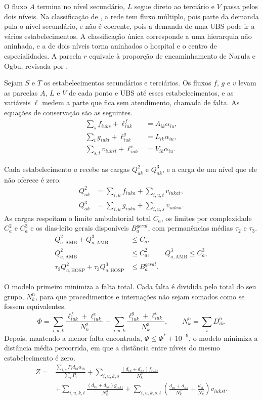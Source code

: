 \documentclass[12pt,a4paper,oneside]{report}
\begin{document}
O fluxo $A$ termina no nível secundário, $L$ segue direto ao terciário e $V$ passa pelos dois níveis. Na
classificação de \citet{sahin2007}, a rede tem fluxo múltiplo, pois parte da demanda pula o nível
secundário, e não é coerente, pois a demanda de uma UBS pode ir a vários estabelecimentos. A classificação
única corresponde a uma hierarquia não aninhada, e a de dois níveis torna aninhados o hospital e o centro
de especialidades. A parcela $r$ equivale à proporção de encaminhamento de Narula e Ogbu, revisada por
\citet{narula1986}.

Sejam $S$ e $T$ os estabelecimentos secundários e terciários. Os fluxos $f$, $g$ e $v$ levam as parcelas
$A$, $L$ e $V$ de cada ponto e UBS até esses estabelecimentos, e as variáveis $\ell$ medem a parte que
fica sem atendimento, chamada de falta. As equações de conservação são as seguintes.
\begin{align}
\sum_s f_{iuks}+\ell^f_{iuk}&=A_{ik}\alpha_{iu},\\
\sum_t g_{iukt}+\ell^g_{iuk}&=L_{ik}\alpha_{iu},\\
\sum_{s,t}v_{iukst}+\ell^v_{iuk}&=V_{ik}\alpha_{iu}.
\end{align}

Cada estabelecimento $a$ recebe as cargas $Q^2_{ak}$ e $Q^3_{ak}$, e a carga de um nível que ele não
oferece é zero.
\begin{align}
Q^2_{ak}&=\sum_{i,u}f_{iuka}+\sum_{i,u,t}v_{iukat},\\
Q^3_{ak}&=\sum_{i,u}g_{iuka}+\sum_{i,u,s}v_{iuksa}.
\end{align}
As cargas respeitam o limite ambulatorial total $C_a$, os limites por complexidade $C_a^2$ e $C_a^3$ e os
dias-leito gerais disponíveis $B_a^{geral}$, com permanências médias $\tau_2$ e $\tau_3$.
\begin{align}
Q^2_{a,\mathrm{AMB}}+Q^3_{a,\mathrm{AMB}}&\leq C_a,\\
Q^2_{a,\mathrm{AMB}}&\leq C_a^2,\qquad Q^3_{a,\mathrm{AMB}}\leq C_a^3,\\
\tau_2Q^2_{a,\mathrm{HOSP}}+\tau_3Q^3_{a,\mathrm{HOSP}}&\leq B_a^{geral}.
\end{align}

O modelo primeiro minimiza a falta total. Cada falta é dividida pelo total do seu grupo, $N^n_k$, para que
procedimentos e internações não sejam somados como se fossem equivalentes.
\begin{equation}
\Phi=\sum_{i,u,k}\frac{\ell^f_{iuk}+\ell^v_{iuk}}{N^2_k}
+\sum_{i,u,k}\frac{\ell^g_{iuk}+\ell^v_{iuk}}{N^3_k},\qquad N^n_k=\sum_iD^n_{ik}.
\end{equation}
Depois, mantendo a menor falta encontrada, $\Phi\leq\Phi^*+10^{-9}$, o modelo minimiza a distância média
percorrida, em que a distância entre níveis do mesmo estabelecimento é zero.
\begin{align}
Z={}&\frac{\sum_{i,u}P_id_{iu}\alpha_{iu}}{\sum_iP_i}
+\sum_{i,u,k,s}\frac{(d_{iu}+d_{us})f_{iuks}}{N^2_k}\nonumber\\
&+\sum_{i,u,k,t}\frac{(d_{iu}+d_{ut})g_{iukt}}{N^3_k}
+\sum_{i,u,k,s,t}\left(\frac{d_{iu}+d_{us}}{N^2_k}+\frac{d_{st}}{N^3_k}\right)v_{iukst}.
\end{align}
\end{document}
